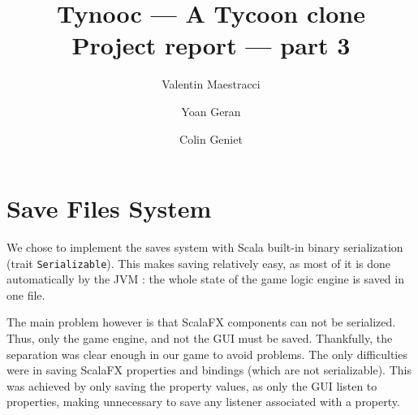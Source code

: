 \documentclass{article}
\begin{document}
\title{Tynooc --- A Tycoon clone \\ \large{Project report --- part 3}}
\author{Valentin Maestracci \and Yoan Geran \and Colin Geniet}
\maketitle
\tableofcontents

\section{Save Files System}
We chose to implement the saves system with Scala built-in binary serialization
(trait \verb|Serializable|). This makes saving relatively easy, as most of it
is done automatically by the JVM : the whole state of the game logic engine is
saved in one file.

The main problem however is that ScalaFX components can not be serialized.
Thus, only the game engine, and not the GUI must be saved.
Thankfully, the separation was clear enough in our game to avoid problems.
The only difficulties were in saving ScalaFX properties and bindings
(which are not serializable). This was achieved by only saving the property
values, as only the GUI listen to properties, making unnecessary to save any
listener associated with a property.

\section{}

\section{}
\end{document}
